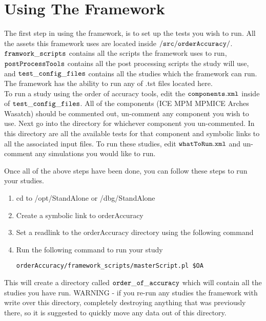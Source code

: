 \section{Using The Framework}

The first step in using the framework, is to set up the tests you wish to run. All the assets this framework uses are located inside $\tt{/src/orderAccuracy/} \normalfont$. $\tt{framwork\_scripts} \normalfont$ contains all the scripts the framework uses to run, $\tt{postProcessTools} \normalfont$ contains all the post processing scripts the study will use, and $\tt{test\_config\_files} \normalfont$ contains all the studies which the framework can run. The framework has the ability to run any of .tst files located here. \\

To run a study using the order of accuracy tools, edit the $\tt{components.xml} \normalfont$ inside of $\tt{test\_config\_files} \normalfont$. All of the components (ICE MPM MPMICE Arches Wasatch) should be commented out, un-comment any component you wish to use. Next go into the directory for whichever component you un-commented. In this directory are all the available tests for that component and symbolic links to all the associated input files. To run these studies, edit $\tt{whatToRun.xml} \normalfont$ and un-comment any simulations you would like to run.

Once all of the above steps have been done, you can follow these steps to run your studies.
\begin{enumerate}

\item cd to /opt/StandAlone or /dbg/StandAlone
\item Create a symbolic link to orderAccuracy \\
\item Set a readlink to the orderAccuracy directory using the following command \\
\item Run the following command to run your study
\begin{verbatim}
orderAccuracy/framework_scripts/masterScript.pl $OA
\end{verbatim}

\end{enumerate}

This will create a directory called $\tt{order\_of\_accuracy} \normalfont$ which will contain all the studies you have run. WARNING - if you re-run any studies the framework with write over this directory, completely destroying anything that was previously there, so it is suggested to quickly move any data out of this directory.

